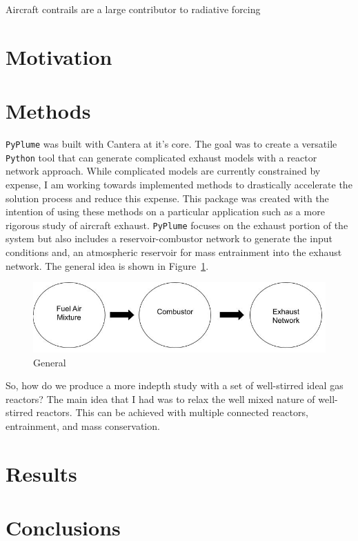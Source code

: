\documentclass[smallextended,referee]{svjour3}
\begin{document}
Aircraft contrails are a large contributor to radiative forcing

\section{Motivation}


\section{Methods}

\texttt{PyPlume} was built with Cantera\cite{cantera} at it's core. The goal was to create a versatile \texttt{Python} tool that can generate complicated exhaust models with a reactor network approach. While complicated models are currently constrained by expense, I am working towards implemented methods to drastically accelerate the solution process and reduce this expense. This package was created with the intention of using these methods on a particular application such as a more rigorous study of aircraft exhaust. \texttt{PyPlume} focuses on the exhaust portion of the system but also includes a reservoir-combustor network to generate the input conditions and, an atmospheric reservoir for mass entrainment into the exhaust network. The general idea is shown in Figure~\ref{fig:general}.

\begin{figure}
    \centering
    \includegraphics[scale=0.65]{examples/report/figs/general.jpg}
    \caption{General}
    \label{fig:general}
\end{figure}

So, how do we produce a more indepth study with a set of well-stirred ideal gas reactors? The main idea that I had was to relax the well mixed nature of well-stirred reactors. This can be achieved with multiple connected reactors, entrainment, and mass conservation. 

\section{Results}

\section{Conclusions}

\begin{acknowledgements}

\end{acknowledgements}

\appendix




\end{document}
